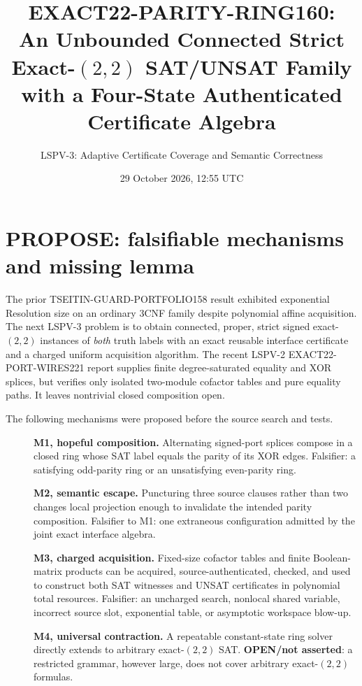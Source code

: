 \documentclass[11pt]{article}
\title{EXACT22-PARITY-RING160:\\An Unbounded Connected Strict Exact-$(2,2)$ SAT/UNSAT Family with a Four-State Authenticated Certificate Algebra}
\author{LSPV-3: Adaptive Certificate Coverage and Semantic Correctness}
\date{29 October 2026, 12:55 UTC}
\begin{document}
\maketitle
\begin{center}\end{center}

\section{PROPOSE: falsifiable mechanisms and missing lemma}
The prior TSEITIN-GUARD-PORTFOLIO158 result exhibited exponential Resolution size on an ordinary 3CNF family despite polynomial affine acquisition. The next LSPV-3 problem is to obtain connected, proper, strict signed exact-$(2,2)$ instances of \emph{both} truth labels with an exact reusable interface certificate and a charged uniform acquisition algorithm. The recent LSPV-2 EXACT22-PORT-WIRES221 report supplies finite degree-saturated equality and XOR splices, but verifies only isolated two-module cofactor tables and pure equality paths. It leaves nontrivial closed composition open.

The following mechanisms were proposed before the source search and tests.
\begin{description}
\item[]\textbf{M1, hopeful composition.} Alternating signed-port splices compose in a closed ring whose SAT label equals the parity of its XOR edges. Falsifier: a satisfying odd-parity ring or an unsatisfying even-parity ring.
\item[]\textbf{M2, semantic escape.} Puncturing three source clauses rather than two changes local projection enough to invalidate the intended parity composition. Falsifier to M1: one extraneous configuration admitted by the joint exact interface algebra.
\item[]\textbf{M3, charged acquisition.} Fixed-size cofactor tables and finite Boolean-matrix products can be acquired, source-authenticated, checked, and used to construct both SAT witnesses and UNSAT certificates in polynomial total resources. Falsifier: an uncharged search, nonlocal shared variable, incorrect source slot, exponential table, or asymptotic workspace blow-up.
\item[]\textbf{M4, universal contraction.} A repeatable constant-state ring solver directly extends to arbitrary exact-$(2,2)$ SAT. \textbf{OPEN/not asserted}: a restricted grammar, however large, does not cover arbitrary exact-$(2,2)$ formulas.
\end{description}
\end{document}
